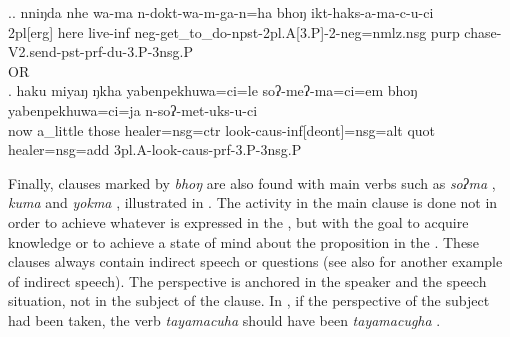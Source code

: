 \ex.\ag. nniŋda nhe  wa-ma      n-dokt-wa-m-ga-n=ha  bhoŋ ikt-haks-a-ma-c-u-ci\\
	{\sc 2pl[erg]} here live{\sc -inf} {\sc neg-}get\_to\_do{\sc -npst-2pl.A[3.P]-2-neg=nmlz.nsg} {\sc purp} chase-{\sc V2.send-pst-prf-du-3.P-3nsg.P}	\\
	 OR \\
	 
	\bg. haku miyaŋ ŋkha yabenpekhuwa=ci=le   soʔ-meʔ-ma=ci=em    bhoŋ yabenpekhuwa=ci=ja    n-soʔ-met-uks-u-ci\\
	now a\_little those healer{\sc =nsg=ctr} look{\sc -caus-inf[deont]=nsg=alt} {\sc quot} healer{\sc =nsg=add} {\sc 3pl.A-}look{\sc -caus-prf-3.P-3nsg.P}\\
	 

	
Finally, clauses marked by \emph{bhoŋ} are also found with main verbs such as \emph{soʔma} , \emph{kuma}  and \emph{yokma} , illustrated in \Next. The activity in the main clause is done not in order to achieve whatever is expressed in the , but with the goal to acquire knowledge or to achieve a state of mind about the proposition in the .  These clauses always contain indirect speech or questions (see also \LLast[c] for another example of indirect speech). The perspective is anchored in the speaker and the speech situation, not in the subject of the clause. In \Next[a], if the perspective of the subject had been taken, the verb \emph{tayamacuha} should have been \emph{tayamacugha}  .

